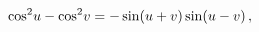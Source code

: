 \[{\mathop{\cos\/}\nolimits^{2}}u-{\mathop{\cos\/}\nolimits^{2}}v=-\mathop{\sin%
\/}\nolimits\!\left(u+v\right)\mathop{\sin\/}\nolimits\!\left(u-v\right),\]